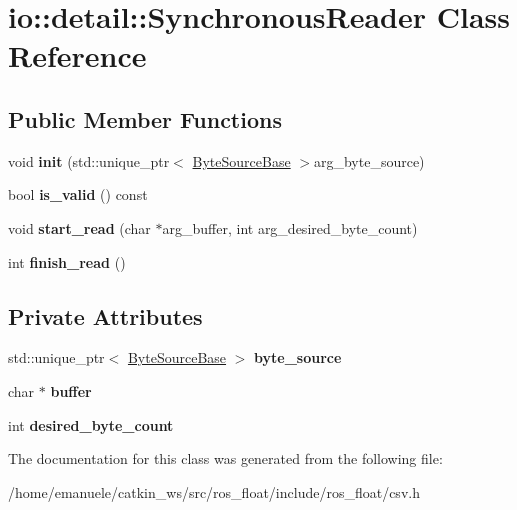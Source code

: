 \hypertarget{classio_1_1detail_1_1SynchronousReader}{}\section{io\+:\+:detail\+:\+:Synchronous\+Reader Class Reference}
\label{classio_1_1detail_1_1SynchronousReader}
\subsection*{Public Member Functions}
\begin{DoxyCompactItemize}
\item 
\mbox{\label{classio_1_1detail_1_1SynchronousReader_a4dc78563ff667b92ad3096a94e834eb5}} 
void {\bfseries init} (std\+::unique\+\_\+ptr$<$ \hyperlink{classio_1_1ByteSourceBase}{Byte\+Source\+Base} $>$arg\+\_\+byte\+\_\+source)
\item 
\mbox{\label{classio_1_1detail_1_1SynchronousReader_a9d6b2c888cc7020df1bb81c8bb5c58bc}} 
bool {\bfseries is\+\_\+valid} () const
\item 
\mbox{\label{classio_1_1detail_1_1SynchronousReader_a6cad1371b97e14f660914898b16433c4}} 
void {\bfseries start\+\_\+read} (char $\ast$arg\+\_\+buffer, int arg\+\_\+desired\+\_\+byte\+\_\+count)
\item 
\mbox{\label{classio_1_1detail_1_1SynchronousReader_a519a0cb25c641d2e51b6542749c44606}} 
int {\bfseries finish\+\_\+read} ()
\end{DoxyCompactItemize}
\subsection*{Private Attributes}
\begin{DoxyCompactItemize}
\item 
\mbox{\label{classio_1_1detail_1_1SynchronousReader_aa4ab4d5029b7d438051b4c800292059d}} 
std\+::unique\+\_\+ptr$<$ \hyperlink{classio_1_1ByteSourceBase}{Byte\+Source\+Base} $>$ {\bfseries byte\+\_\+source}
\item 
\mbox{\label{classio_1_1detail_1_1SynchronousReader_aa57e237e05bd90abdd9e896647da3fc7}} 
char $\ast$ {\bfseries buffer}
\item 
\mbox{\label{classio_1_1detail_1_1SynchronousReader_ac85e7a1b24cd383fb9fbfafe648f9ad6}} 
int {\bfseries desired\+\_\+byte\+\_\+count}
\end{DoxyCompactItemize}


The documentation for this class was generated from the following file\+:\begin{DoxyCompactItemize}
\item 
/home/emanuele/catkin\+\_\+ws/src/ros\+\_\+float/include/ros\+\_\+float/csv.\+h\end{DoxyCompactItemize}
